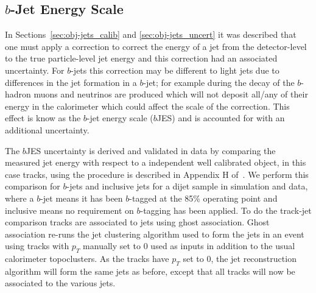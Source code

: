 \clearpage
\subsection{$b$-Jet Energy Scale}
\label{sec:obj-bjets_bjes}

In Sections~\ref{sec:obj-jets_calib} and \ref{sec:obj-jets_uncert} it was described that one
must apply a correction to correct the energy of a jet from the detector-level to the true particle-level jet energy
and this correction had an associated uncertainty.
For $b$-jets this correction may be different to light jets due to differences in the jet formation in a $b$-jet;
for example during the decay of the $b$-hadron muons and neutrinos are produced which will not deposit all/any of their energy in the calorimeter
which could affect the scale of the correction. This effect is know as the $b$-jet energy scale ($b$JES) and is accounted for with an additional uncertainty.

The $b$JES uncertainty is derived and validated in data by comparing the measured jet energy with respect to a independent well calibrated object,
in this case tracks, using the procedure is described in Appendix H of~\cite{dibjet-int_mori16}.
We perform this comparison for $b$-jets and inclusive jets for a dijet sample in simulation and data,
where a $b$-jet means it has been $b$-tagged at the 85\% operating point and inclusive means no requirement on $b$-tagging has been applied. 
To do the track-jet comparison tracks are associated to jets using ghost association.
Ghost association re-runs the jet clustering algorithm used to form the jets in an event using
tracks with $p_T$ manually set to 0 used as inputs in addition to the usual calorimeter topoclusters.
As the tracks have $p_T$ set to 0, the jet reconstruction algorithm will form the same jets as before,
except that all tracks will now be associated to the various jets.

